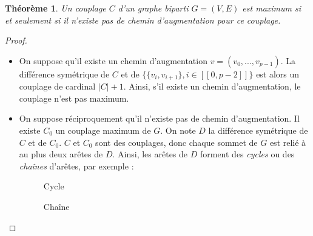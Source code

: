 \documentclass[11pt,a4paper]{article}
\newtheorem*{theorem}{Théorème} %
\begin{document}
\begin{theorem}
  Un couplage \(C\) d'un graphe biparti \(G=(V,E)\) est maximum si et seulement si il n'existe pas de chemin d'augmentation pour ce couplage.
\end{theorem}
\begin{proof}\leavevmode
  \begin{itemize}
    \item On suppose qu'il existe un chemin d'augmentation \(v = (v_0, ..., v_{p-1})\). La différence symétrique de \(C\) et de \(\{ \{v_i,v_{i+1}\}, i \in [\![0,p-2]\!] \}\) est alors un couplage de cardinal \(|C|+1\). Ainsi, s'il existe un chemin d'augmentation, le couplage n'est pas maximum.

    \item
      On suppose réciproquement qu'il n'existe pas de chemin d'augmentation. Il existe \(C_0\) un couplage maximum de \(G\). On note \(D\) la différence symétrique de \(C\) et de \(C_0\). \(C\) et \(C_0\) sont des couplages, donc chaque sommet de \(G\) est relié à au plus deux arêtes de \(D\). Ainsi, les arêtes de \(D\) forment des \textit{cycles} ou des \textit{chaînes} d'arêtes, par exemple :

      \begin{figure}[ht]
        \centering
        \begin{minipage}{.5\textwidth}
          \centering
          \caption{Cycle}
          \vspace{2mm}
        \end{minipage}%
        \begin{minipage}{.5\textwidth}
          \centering
          \caption{Chaîne}
          \vspace{2mm}
        \end{minipage}
      \end{figure}


\end{itemize}
\end{proof}
\end{document}

